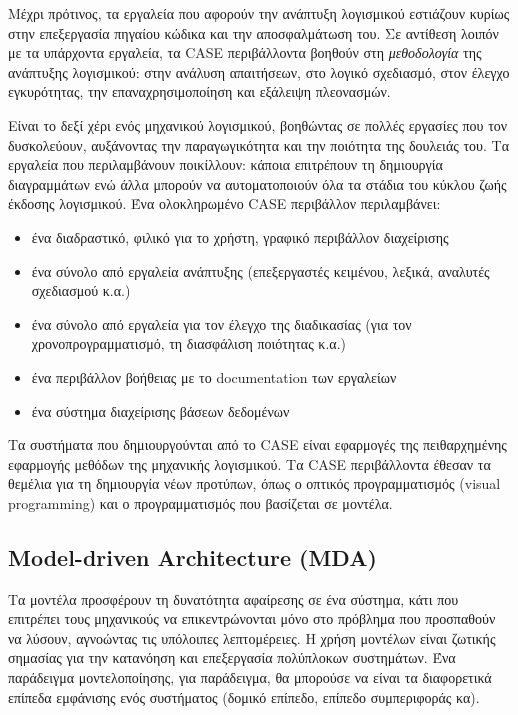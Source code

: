             Μέχρι πρότινος, τα εργαλεία που αφορούν την ανάπτυξη λογισμικού εστιάζουν κυρίως στην επεξεργασία πηγαίου κώδικα και την αποσφαλμάτωση του. Σε αντίθεση λοιπόν με τα υπάρχοντα εργαλεία, τα CASE περιβάλλοντα βοηθούν στη \textit{μεθοδολογία} της ανάπτυξης λογισμικού: στην ανάλυση απαιτήσεων, στο λογικό σχεδιασμό, στον έλεγχο εγκυρότητας, την επαναχρησιμοποίηση και εξάλειψη πλεονασμών.

            Είναι το δεξί χέρι ενός μηχανικού λογισμικού, βοηθώντας σε πολλές εργασίες που τον δυσκολεύουν, αυξάνοντας την παραγωγικότητα και την ποιότητα της δουλειάς του. Τα εργαλεία που περιλαμβάνουν ποικίλλουν: κάποια επιτρέπουν τη δημιουργία διαγραμμάτων ενώ άλλα μπορούν να αυτοματοποιούν όλα τα στάδια του κύκλου ζωής έκδοσης λογισμικού. Ένα ολοκληρωμένο CASE περιβάλλον περιλαμβάνει:
            \vspace{-0.5em}
            \begin{itemize}[label={\tiny \blacksquare}]
                \setlength\itemsep{-0.25em}
                \item ένα διαδραστικό, φιλικό για το χρήστη, γραφικό περιβάλλον διαχείρισης
                \item ένα σύνολο από εργαλεία ανάπτυξης (επεξεργαστές κειμένου, λεξικά, αναλυτές σχεδιασμού κ.α.)
                \item ένα σύνολο από εργαλεία για τον έλεγχο της διαδικασίας (για τον χρονοπρογραμματισμό, τη διασφάλιση ποιότητας κ.α.)
                \item ένα περιβάλλον βοήθειας με το documentation των εργαλείων
                \item ένα σύστημα διαχείρισης βάσεων δεδομένων
            \end{itemize}
            \vspace{-0.5em}

            Τα συστήματα που δημιουργούνται από το CASE είναι εφαρμογές της πειθαρχημένης εφαρμογής μεθόδων της μηχανικής λογισμικού.
            Τα CASE περιβάλλοντα έθεσαν τα θεμέλια για τη δημιουργία νέων προτύπων, όπως ο οπτικός προγραμματισμός (visual programming) και ο προγραμματισμός που βασίζεται σε μοντέλα. \cite{CASEChikofsky, Case1985, CASEKuhn, AdoptionCASE}

        \subsection{Model-driven Architecture (MDA)}
            Τα μοντέλα προσφέρουν τη δυνατότητα αφαίρεσης σε ένα σύστημα, κάτι που επιτρέπει τους μηχανικούς να επικεντρώνονται μόνο στο πρόβλημα που προσπαθούν να λύσουν, αγνοώντας τις υπόλοιπες λεπτομέρειες. Η χρήση μοντέλων είναι ζωτικής σημασίας για την κατανόηση και επεξεργασία πολύπλοκων συστημάτων. Ένα παράδειγμα μοντελοποίησης, για παράδειγμα, θα μπορούσε να είναι τα διαφορετικά επίπεδα εμφάνισης ενός συστήματος (δομικό επίπεδο, επίπεδο συμπεριφοράς κα).

